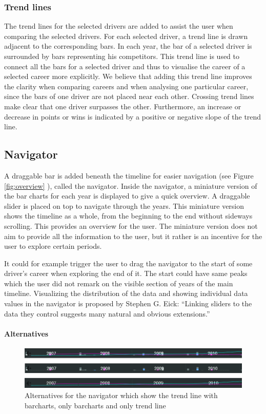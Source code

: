 \documentclass{sigchi}
\begin{document}
\subsubsection{Trend lines}
\label{trend lines}
The trend lines for the selected drivers are added to assist the user when comparing the selected drivers. For each selected driver, a trend line is drawn adjacent to the corresponding bars. In each year, the bar of a selected driver is surrounded by bars representing his competitors. This trend line is used to connect all the bars for a selected driver and thus to visualise the career of a selected career more explicitly. We believe that adding this trend line improves the clarity when comparing careers and when analysing one particular career, since the bars of one driver are not placed near each other. Crossing trend lines make clear that one driver surpasses the other. Furthermore, an increase or decrease in points or wins is indicated by a positive or negative slope of the trend line. 


\subsection{Navigator}

A draggable bar is added beneath the timeline for easier navigation (see Figure \ref{fig:overview} ), called the navigator. Inside the navigator, a miniature version of the bar charts for each year is displayed to give a quick overview. A draggable slider is placed on top to navigate through the years.
This miniature version shows the timeline as a whole, from the beginning to the end without sideways scrolling. This provides an overview for the user. The miniature version does not aim to provide all the information to the user, but it rather is an incentive for the user to explore certain periods. 

It could for example trigger the user to drag the navigator to the start of some driver’s career when exploring the end of it. The start could have same peaks which the user did not remark on the visible section of years of the main timeline. Visualizing the distribution of the data and showing individual data values in the navigator is proposed by Stephen G. Eick\cite{eick1994data}: “Linking sliders to the data they control suggests many natural and obvious extensions.”



\paragraph{Alternatives}
\begin{figure}[tp]
\centering
\includegraphics[width=1\textwidth]{images/navigators.jpg}
\caption{Alternatives for the navigator which show the trend line with barcharts, only barcharts and only trend line}
\label{fig:navigator}
\end{figure}
\end{document}
